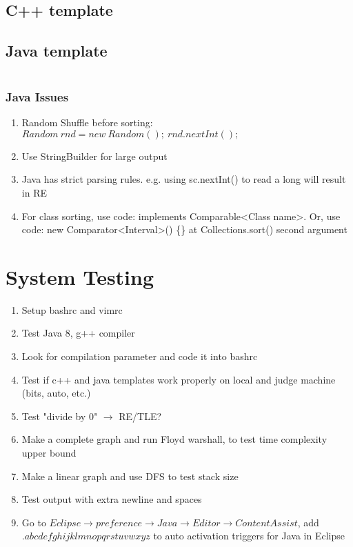\documentclass[10pt,oneside]{article}
\begin{document}
\begin{landscape}
\begin{multicols}{2}
\subsection{C++ template}

\subsection{Java template}
%
\inputminted{java}{contest_setup/Main.java}

\subsubsection{Java Issues}
\begin{enumerate}
	\item Random Shuffle before sorting: $Random\ rnd = new\ Random();\ rnd.nextInt();$
	\item Use StringBuilder for large output
	\item Java has strict parsing rules. e.g. using sc.nextInt() to read a long will result in RE
	\item For class sorting, use code: implements Comparable<Class name>. Or, use code: new Comparator<Interval>() \{\} at Collections.sort() second argument
\end{enumerate}

\section{System Testing}

\begin{enumerate}
	\item Setup bashrc and vimrc
	\item Test Java 8, g++ compiler 
	\item Look for compilation parameter and code it into bashrc
	\item Test if c++ and java templates work properly on local and judge machine (bits, auto, etc.)
	\item Test "divide by 0" $\rightarrow$ RE/TLE?
	\item Make a complete graph and run Floyd warshall, to test time complexity upper bound
	\item Make a linear graph and use DFS to test stack size
	\item Test output with extra newline and spaces
	\item Go to $Eclipse \rightarrow preference \rightarrow Java \rightarrow Editor \rightarrow Content Assist$, add $.abcdefghijklmnopqrstuvwxyz$ to auto activation triggers for Java in Eclipse
\end{enumerate}


\end{multicols}
\end{landscape}
\end{document}
